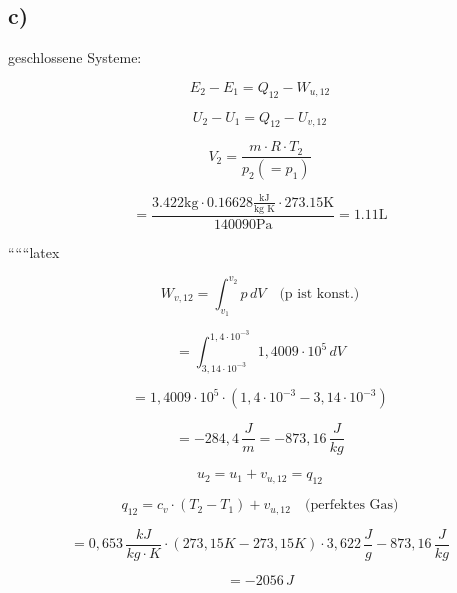 

\subsection*{c)}

\noindent
geschlossene Systeme:

\[
E_2 - E_1 = Q_{12} - W_{u,12}
\]

\[
U_2 - U_1 = Q_{12} - U_{v,12}
\]

\[
V_2 = \frac{m \cdot R \cdot T_2}{p_2 ( = p_1)}
\]

\[
= \frac{3.422 \text{kg} \cdot 0.16628 \frac{\text{kJ}}{\text{kg K}} \cdot 273.15 \text{K}}{140090 \text{Pa}} = 1.11 \text{L}
\]

``````latex


\[
W_{v,12} = \int_{v_1}^{v_2} p \, dV \quad \text{(p ist konst.)}
\]

\[
= \int_{3,14 \cdot 10^{-3}}^{1,4 \cdot 10^{-3}} 1,4009 \cdot 10^5 \, dV
\]

\[
= 1,4009 \cdot 10^5 \cdot \left(1,4 \cdot 10^{-3} - 3,14 \cdot 10^{-3}\right)
\]

\[
= -284,4 \, \frac{J}{m} = -873,16 \, \frac{J}{kg}
\]

\[
u_2 = u_1 + v_{u,12} = q_{12}
\]

\[
q_{12} = c_v \cdot (T_2 - T_1) + v_{u,12} \quad \text{(perfektes Gas)}
\]

\[
= 0,653 \, \frac{kJ}{kg \cdot K} \cdot (273,15K - 273,15K) \cdot 3,622 \, \frac{J}{g} - 873,16 \, \frac{J}{kg}
\]

\[
= -2056 \, J
\]